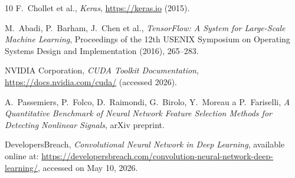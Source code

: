 \begin{thebibliography}{10}
F.~Chollet et al., 
\textit{Keras}, 
\url{https://keras.io} (2015).

M.~Abadi, P.~Barham, J.~Chen et al., 
\textit{TensorFlow: A System for Large-Scale Machine Learning}, 
Proceedings of the 12th USENIX Symposium on Operating Systems Design and Implementation (2016), 265--283.

NVIDIA Corporation, 
\textit{CUDA Toolkit Documentation}, 
\url{https://docs.nvidia.com/cuda/} (accessed 2026).

A.~Passemiers, P.~Folco, D.~Raimondi, G.~Birolo, Y.~Moreau a P.~Fariselli, 
\textit{A Quantitative Benchmark of Neural Network Feature Selection Methods for Detecting Nonlinear Signals}, 
arXiv preprint.

DevelopersBreach, \textit{Convolutional Neural Network in Deep Learning}, 
available online at: \url{https://developersbreach.com/convolution-neural-network-deep-learning/}, 
accessed on May 10, 2026.

\end{thebibliography}
\cleardoublepage
